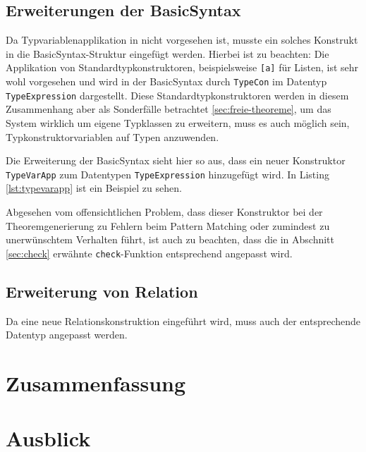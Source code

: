 \documentclass[11pt]{article} %
\begin{document}
\subsection{Erweiterungen der BasicSyntax}

Da Typvariablenapplikation in \cite{freetheorems} nicht vorgesehen ist, musste ein solches Konstrukt in die BasicSyntax-Struktur eingefügt werden. Hierbei ist zu beachten: Die Applikation
von Standardtypkonstruktoren, beispielsweise \texttt{[a]} für Listen, ist sehr wohl vorgesehen und wird in der BasicSyntax durch \texttt{TypeCon} im Datentyp \texttt{TypeExpression} dargestellt.  Diese Standardtypkonstruktoren werden in diesem Zusammenhang aber als Sonderfälle betrachtet \ref{sec:freie-theoreme}, um das System wirklich um eigene Typklassen zu erweitern, muss es auch möglich sein, Typkonstruktorvariablen auf Typen anzuwenden.

Die Erweiterung der BasicSyntax sieht hier so aus, dass ein neuer Konstruktor \texttt{TypeVarApp} zum Datentypen \texttt{TypeExpression} hinzugefügt wird. In Listing \ref{lst:typevarapp} ist ein Beispiel zu sehen.



Abgesehen vom offensichtlichen Problem, dass dieser Konstruktor bei der Theoremgenerierung zu Fehlern beim Pattern Matching oder zumindest zu unerwünschtem Verhalten führt,
ist auch zu beachten, dass die in Abschnitt \ref{sec:check} erwähnte \texttt{check}-Funktion entsprechend angepasst wird.

\subsection{Erweiterung von Relation}

Da eine neue Relationskonstruktion eingeführt wird, muss auch der entsprechende Datentyp angepasst werden.

\section{Zusammenfassung}

\section{Ausblick}



\end{document}
